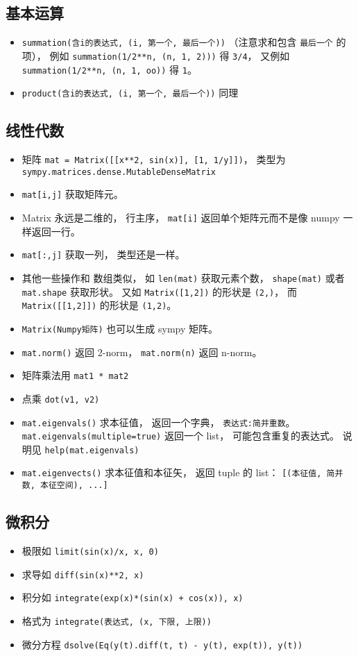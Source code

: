 \subsection{基本运算}
\begin{itemize}
\item \verb`summation(含i的表达式, (i, 第一个, 最后一个))` （注意求和包含 \verb`最后一个` 的项）， 例如 \verb`summation(1/2**n, (n, 1, 2)))` 得 \verb`3/4`， 又例如 \verb`summation(1/2**n, (n, 1, oo))` 得 \verb`1`。
\item \verb`product(含i的表达式, (i, 第一个, 最后一个))` 同理
\end{itemize}

\subsection{线性代数}
\begin{itemize}
\item 矩阵 \verb`mat = Matrix([[x**2, sin(x)], [1, 1/y]])`， 类型为 \verb`sympy.matrices.dense.MutableDenseMatrix`
\item \verb`mat[i,j]` 获取矩阵元。
\item Matrix 永远是二维的， 行主序， \verb`mat[i]` 返回单个矩阵元而不是像 numpy 一样返回一行。
\item \verb`mat[:,j]` 获取一列， 类型还是一样。
\item 其他一些操作和 数组类似， 如 \verb`len(mat)` 获取元素个数， \verb`shape(mat)` 或者 \verb`mat.shape` 获取形状。 又如 \verb`Matrix([1,2])` 的形状是 \verb`(2,)`， 而 \verb`Matrix([[1,2]])` 的形状是 \verb`(1,2)`。
\item \verb`Matrix(Numpy矩阵)` 也可以生成 sympy 矩阵。
\item \verb`mat.norm()` 返回 2-norm， \verb`mat.norm(n)` 返回 n-norm。
\item 矩阵乘法用 \verb`mat1 * mat2`
\item 点乘 \verb`dot(v1, v2)`
\item \verb`mat.eigenvals()` 求本征值， 返回一个字典， \verb`表达式:简并重数`。 \verb`mat.eigenvals(multiple=true)` 返回一个 list， 可能包含重复的表达式。 说明见 \verb`help(mat.eigenvals)`
\item \verb`mat.eigenvects()` 求本征值和本征矢， 返回 tuple 的 list： \verb`[(本征值, 简并数, 本征空间), ...]`
\end{itemize}


\subsection{微积分}
\begin{itemize}
\item 极限如 \verb`limit(sin(x)/x, x, 0)`
\item 求导如 \verb`diff(sin(x)**2, x)`
\item 积分如 \verb`integrate(exp(x)*(sin(x) + cos(x)), x)`
\item 格式为 \verb`integrate(表达式, (x, 下限, 上限))`
\item 微分方程 \verb`dsolve(Eq(y(t).diff(t, t) - y(t), exp(t)), y(t))`
\end{itemize}


